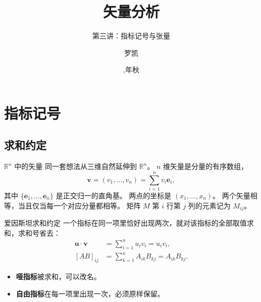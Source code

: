 \documentclass[fontset=windows, chinese, 10pt, xcolor=dvipsnames]{beamer}
\title{矢量分析}
\subtitle{第三讲：指标记号与张量}
\date{\zhdigits{\the\year},\zhganzhinian{\the\year}年秋}
\author{罗凯}
\institute{南京理工大学物理学院}
\begin{document}
\begin{frame}
  \titlepage
\end{frame}


\begin{frame}
  \titlepage
\end{frame}


\section{指标记号}

\subsection{求和约定}

\begin{frame}{$\mathbb{R}^n$ 中的矢量}
  同一套想法从三维自然延伸到 $\mathbb{R}^n$。
  $n$ 维矢量是分量的有序数组，
  \begin{equation*}
    \mathbf{v}
    =(v_1,\ldots,v_n)
    =\sum_{i=1}^{n}v_i\mathbf{e}_i,
  \end{equation*}
  其中 $\{\mathbf{e}_1,\ldots,\mathbf{e}_n\}$ 是正交归一的直角基。
  两点的坐标是 $(x_1,\ldots,x_n)$。
  两个矢量相等，当且仅当每一个对应分量都相等。
  矩阵 $M$ 第 $i$ 行第 $j$ 列的元素记为 $M_{ij}$。
\end{frame}

\begin{frame}{爱因斯坦求和约定}
  一个指标在同一项里恰好出现两次，就对该指标的全部取值求和，求和号省去：
  \begin{align*}
    \mathbf{u}\cdot\mathbf{v}
    &=\sum_{i=1}^{n}u_i v_i
     =u_i v_i,\\[0.4em]
    [AB]_{ij}
    &=\sum_{k=1}^{n}A_{ik}B_{kj}
     =A_{ik}B_{kj}.
  \end{align*}
  \begin{itemize}
    \item \textbf{哑指标}被求和，可以改名。
    \item \textbf{自由指标}在每一项里出现一次，必须原样保留。
  \end{itemize}
\end{frame}
\end{document}
